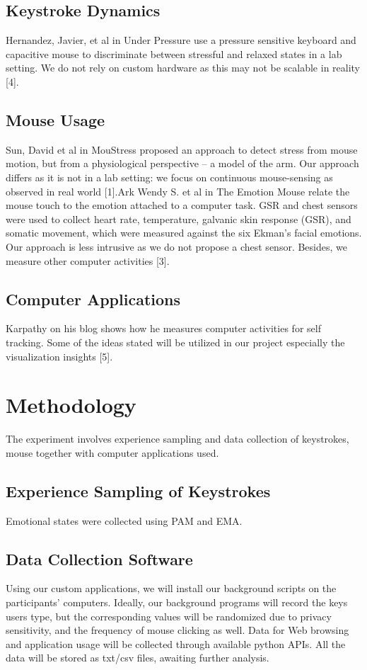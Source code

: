 \documentclass{article}
\begin{document}
\subsection{Keystroke Dynamics}
Hernandez, Javier, et al in Under Pressure use a pressure sensitive keyboard and capacitive mouse to discriminate between stressful and relaxed states in a lab setting. We do not rely on custom hardware as this may not be scalable in reality [4].

\subsection{Mouse Usage}
Sun, David et al in MouStress proposed an approach to detect stress from mouse motion, but from a physiological perspective -- a model of the arm. Our approach differs as it is not in a lab setting: we focus on continuous mouse-sensing as observed in real world [1].Ark Wendy S. et al in The Emotion Mouse relate the mouse touch to the emotion attached to a computer task. GSR and chest sensors were used to collect heart rate, temperature, galvanic skin response (GSR), and somatic movement, which were measured against the six Ekman’s facial emotions. Our approach is less intrusive as we do not propose a chest sensor. Besides, we measure other computer activities [3].
\subsection{Computer Applications}
Karpathy on his blog shows how he measures computer activities for self tracking. Some of the ideas stated will be utilized in our project especially the visualization insights [5].

\section{Methodology}
The experiment involves experience sampling and data collection of keystrokes, mouse together with computer applications used.
\subsection{Experience Sampling of Keystrokes}
Emotional states were collected using PAM and EMA. 
\subsection{Data Collection Software}
Using our custom applications, we will install our background scripts on the participants’ computers. Ideally, our background programs will record the keys users type, but the corresponding values will be randomized due to privacy sensitivity, and the frequency of mouse clicking as well.
Data for Web browsing and application usage will be collected through available python APIs. All the data will be stored as txt/csv files, awaiting further analysis.
\end{document}
